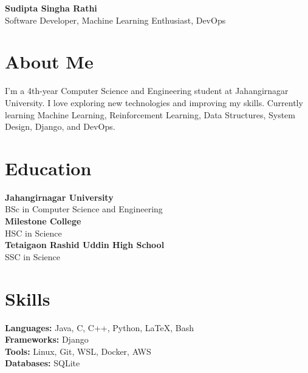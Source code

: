 \documentclass[a4paper,10pt]{article}
\begin{document}
\begin{minipage}{0.72\textwidth}
    {\LARGE\bfseries Sudipta Singha Rathi}\\[0.5em]
    {\large{Software Developer, Machine Learning Enthusiast, DevOps}}
\end{minipage}%
\hfill
\begin{minipage}{0.23\textwidth}
    \centering
\end{minipage}

\section*{About Me}
I'm a 4th-year Computer Science and Engineering student at Jahangirnagar University. I love exploring new technologies and improving my skills.
Currently learning Machine Learning, Reinforcement Learning, Data Structures, System Design, Django, and DevOps.

\section*{Education}

\textbf{Jahangirnagar University}\\
BSc in Computer Science and Engineering\\
\textbf{Milestone College} \\
HSC in Science\\
\textbf{Tetaigaon Rashid Uddin High School}\\
SSC in Science

\section*{Skills}
\textbf{Languages:} Java, C, C++, Python, LaTeX, Bash\\
\textbf{Frameworks:} Django\\
\textbf{Tools:} Linux, Git, WSL, Docker, AWS\\
\textbf{Databases:} SQLite
\end{document}
